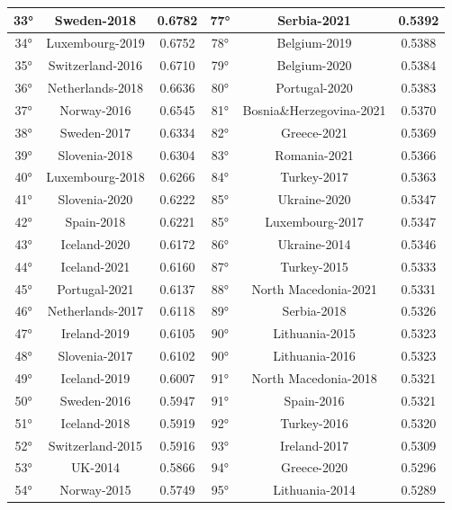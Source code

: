 \documentclass[a4paper,12pt, openright]{report}
\begin{document}
\begin{longtable}[c]{|c|c|c|c|c|c|}
    \hline
    33° &  Sweden-2018 & 0.6782 & 77° &  Serbia-2021 & 0.5392\\
    \hline
    34° &  Luxembourg-2019 & 0.6752 & 78° &  Belgium-2019 & 0.5388 \\
    \hline
    35° &  Switzerland-2016 & 0.6710 & 79° &  Belgium-2020 & 0.5384 \\
    \hline
    36° &  Netherlands-2018 & 0.6636 & 80°&  Portugal-2020 & 0.5383 \\
    \hline
    37° &  Norway-2016 & 0.6545 & 81° &  Bosnia\&Herzegovina-2021 & 0.5370  \\
    \hline
    38° &  Sweden-2017 & 0.6334 & 82° &  Greece-2021 & 0.5369\\
    \hline
    39° & Slovenia-2018 & 0.6304 & 83°	&  Romania-2021 & 0.5366 \\
    \hline
    40° & Luxembourg-2018 & 0.6266  & 84° &  Turkey-2017 & 0.5363 \\
    \hline
    41° &  Slovenia-2020 & 0.6222 & 85° &  Ukraine-2020 & 0.5347 \\
    \hline
    42° &  Spain-2018 & 0.6221 & 85° &  Luxembourg-2017 & 0.5347 \\
    \hline
    43° &  Iceland-2020 & 0.6172 & 86° &  Ukraine-2014 & 0.5346 \\
    \hline
    44° &  Iceland-2021 & 0.6160 & 87° &  Turkey-2015 & 0.5333 \\
    \hline
    45° & Portugal-2021 & 0.6137 & 88° &  North Macedonia-2021 & 0.5331  \\
    \hline
    46° &  Netherlands-2017 & 0.6118 & 89° &  Serbia-2018 & 0.5326\\
    \hline
    47° &  Ireland-2019 & 0.6105 & 90° &  Lithuania-2015 & 0.5323 \\
    \hline
    48° &  Slovenia-2017 & 0.6102 & 90° &  Lithuania-2016 & 0.5323 \\
    \hline
    49° &  Iceland-2019 & 0.6007 & 91° &  North Macedonia-2018  & 0.5321 \\
    \hline
    50° &  Sweden-2016 & 0.5947 & 91° &  Spain-2016 & 0.5321 \\
    \hline
    51° &  Iceland-2018 & 0.5919 & 92°	&  Turkey-2016 & 0.5320 \\
    \hline
    52° &  Switzerland-2015 & 0.5916 & 93° &  Ireland-2017 & 0.5309 \\
    \hline
    53° &   UK-2014 & 0.5866 & 94° &  Greece-2020 & 0.5296 \\
    \hline
    54° &  Norway-2015 & 0.5749 & 95° &  Lithuania-2014 & 0.5289 \\

\end{longtable}
\end{document}
